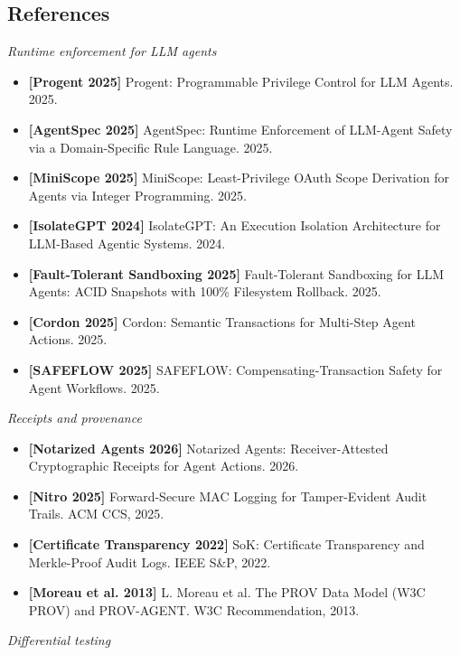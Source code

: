 \documentclass[
]{article}
\providecommand{\tightlist}{%
  \setlength{\itemsep}{0pt}\setlength{\parskip}{0pt}}
\begin{document}
\subsection{References}\label{references}

\emph{Runtime enforcement for LLM agents}

\begin{itemize}
\tightlist
\item
  \textbf{{[}Progent 2025{]}} Progent: Programmable Privilege Control
  for LLM Agents. 2025.
\item
  \textbf{{[}AgentSpec 2025{]}} AgentSpec: Runtime Enforcement of
  LLM-Agent Safety via a Domain-Specific Rule Language. 2025.
\item
  \textbf{{[}MiniScope 2025{]}} MiniScope: Least-Privilege OAuth Scope
  Derivation for Agents via Integer Programming. 2025.
\item
  \textbf{{[}IsolateGPT 2024{]}} IsolateGPT: An Execution Isolation
  Architecture for LLM-Based Agentic Systems. 2024.
\item
  \textbf{{[}Fault-Tolerant Sandboxing 2025{]}} Fault-Tolerant
  Sandboxing for LLM Agents: ACID Snapshots with 100\% Filesystem
  Rollback. 2025.
\item
  \textbf{{[}Cordon 2025{]}} Cordon: Semantic Transactions for
  Multi-Step Agent Actions. 2025.
\item
  \textbf{{[}SAFEFLOW 2025{]}} SAFEFLOW: Compensating-Transaction Safety
  for Agent Workflows. 2025.
\end{itemize}

\emph{Receipts and provenance}

\begin{itemize}
\tightlist
\item
  \textbf{{[}Notarized Agents 2026{]}} Notarized Agents:
  Receiver-Attested Cryptographic Receipts for Agent Actions. 2026.
\item
  \textbf{{[}Nitro 2025{]}} Forward-Secure MAC Logging for
  Tamper-Evident Audit Trails. ACM CCS, 2025.
\item
  \textbf{{[}Certificate Transparency 2022{]}} SoK: Certificate
  Transparency and Merkle-Proof Audit Logs. IEEE S\&P, 2022.
\item
  \textbf{{[}Moreau et al. 2013{]}} L. Moreau et al. The PROV Data Model
  (W3C PROV) and PROV-AGENT. W3C Recommendation, 2013.
\end{itemize}

\emph{Differential testing}
\end{document}
